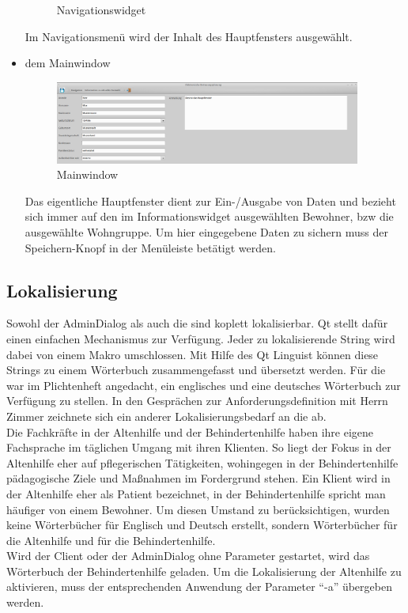 \begin{itemize}
\begin{figure}[h]
\begin{center}
			\caption{Navigationswidget}
		\end{center}
	\end{figure}
	\FloatBarrier
	\noindent
	Im Navigationsmenü wird der Inhalt des Hauptfensters ausgewählt.
	\item dem Mainwindow
	\begin{figure}[h]
		\begin{center}
			\includegraphics[keepaspectratio=true, width=0.95\textwidth]{pics/client_main.png}
			\caption{Mainwindow}
		\end{center}
	\end{figure}
	\FloatBarrier
	\noindent
	Das eigentliche Hauptfenster dient zur Ein-/Ausgabe von Daten und bezieht sich immer auf den im Informationswidget ausgewählten Bewohner, bzw die ausgewählte Wohngruppe. Um hier eingegebene Daten zu sichern muss der Speichern-Knopf in der Menüleiste betätigt werden.
\end{itemize}

\subsection{Lokalisierung}
Sowohl der AdminDialog als auch die \EBP sind koplett lokalisierbar. Qt stellt dafür einen einfachen Mechanismus zur Verfügung. Jeder zu
lokalisierende String wird dabei von einem Makro umschlossen. Mit Hilfe des Qt Linguist können diese Strings zu einem Wörterbuch zusammengefasst und
übersetzt werden. Für die \EBP war im Plichtenheft angedacht, ein englisches und eine deutsches Wörterbuch zur Verfügung zu stellen. In den
Gesprächen zur Anforderungsdefinition mit Herrn Zimmer zeichnete sich ein anderer Lokalisierungsbedarf an die \EBP ab.\\
Die Fachkräfte in der Altenhilfe und der Behindertenhilfe haben ihre eigene Fachsprache im täglichen Umgang mit ihren Klienten. So liegt der Fokus in
der Altenhilfe eher auf pflegerischen Tätigkeiten, wohingegen in der Behindertenhilfe pädagogische Ziele und Maßnahmen im Fordergrund stehen. Ein
Klient wird in der Altenhilfe eher als Patient bezeichnet, in der Behindertenhilfe spricht man häufiger von einem Bewohner. Um diesen Umstand zu
berücksichtigen, wurden keine Wörterbücher für Englisch und Deutsch erstellt, sondern Wörterbücher für die Altenhilfe und für die Behindertenhilfe.\\
Wird der Client oder der AdminDialog ohne Parameter gestartet, wird das Wörterbuch der Behindertenhilfe geladen. Um die Lokalisierung der Altenhilfe
zu aktivieren, muss der entsprechenden Anwendung der Parameter ``-a'' übergeben werden.

